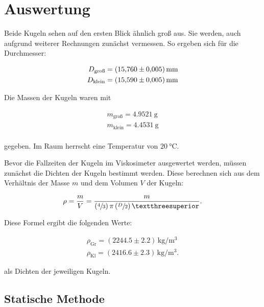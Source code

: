 %

%
\section{Auswertung}
\label{sec:Auswertung}

Beide Kugeln sehen auf den ersten Blick ähnlich groß aus. Sie werden, auch aufgrund weiterer Rechnungen zunächst 
vermessen. So ergeben sich für die Durchmesser:

\begin{align*}
    D_\text{groß} = \qty{15.760 +- 0.005}{\milli \meter} \\
    D_\text{klein} = \qty{15.590 +- 0.005}{\milli \meter} \\
\end{align*}

\noindent
Die Massen der Kugeln waren mit

\begin{align*}
    m_\text{groß} = \qty{4.9521}{\gram} \\
    m_\text{klein} = \qty{4.4531}{\gram} \\
\end{align*}

\noindent
gegeben.
Im Raum herrscht eine Temperatur von $\qty{20}{\celsius}$. 

\noindent Bevor die Fallzeiten der Kugeln im Viskosimeter ausgewertet werden, müssen zunächst die Dichten der Kugeln 
bestimmt werden. Diese berechnen sich aus dem Verhältnis der Masse $m$ und dem Volumen $V$ der Kugeln:

\begin{equation*}
    \rho = \frac{m}{V} = \frac{m}{\left(\sfrac{4}{3}\right)\pi\left(\sfrac{D}{2}\right)³}.
\end{equation*}

\noindent Diese Formel ergibt die folgenden Werte:

\begin{gather*}
    \rho_\text{Gr} = \left(2244.5 \pm 2.2\right)\,\unit{\kilo\gram\per\cubic\meter} \\
    \rho_\text{Kl} = \left(2416.6 \pm 2.3\right)\,\unit{\kilo\gram\per\cubic\meter}.
\end{gather*}

\noindent als Dichten der jeweiligen Kugeln.

\subsection{Statische Methode}

